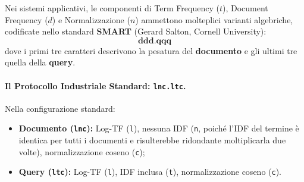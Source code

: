 Nei sistemi applicativi, le componenti di Term Frequency ($t$), Document Frequency ($d$) e Normalizzazione ($n$) ammettono molteplici varianti algebriche, codificate nello standard \textbf{SMART} (Gerard Salton, Cornell University):
\begin{equation}
\textbf{ddd.qqq}
\end{equation}
dove i primi tre caratteri descrivono la pesatura del \textbf{documento} e gli ultimi tre quella della \textbf{query}.

\begin{table}[H]
\centering
\small
{}
\caption{Tassonomia delle varianti di ponderazione nella notazione SMART~\cite{manning2008}.}
\label{tab:smart-taxonomy}
\end{table}

\paragraph{Il Protocollo Industriale Standard: \texttt{lnc.ltc}.}
Nella configurazione standard:
\begin{itemize}
    \item \textbf{Documento (\texttt{lnc}):} Log-TF (\texttt{l}), nessuna IDF (\texttt{n}, poich\'e l'IDF del termine \`e identica per tutti i documenti e risulterebbe ridondante moltiplicarla due volte), normalizzazione coseno (\texttt{c});
    \item \textbf{Query (\texttt{ltc}):} Log-TF (\texttt{l}), IDF inclusa (\texttt{t}), normalizzazione coseno (\texttt{c}).
\end{itemize}

